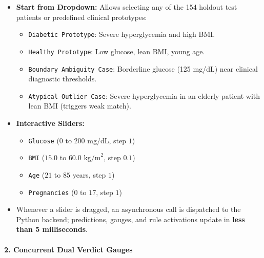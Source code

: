 \begin{itemize}
\tightlist
\item
  \textbf{Start from Dropdown:} Allows selecting any of the 154 holdout
  test patients or predefined clinical prototypes:

  \begin{itemize}
  \tightlist
  \item
    \texttt{Diabetic\ Prototype}: Severe hyperglycemia and high BMI.
  \item
    \texttt{Healthy\ Prototype}: Low glucose, lean BMI, young age.
  \item
    \texttt{Boundary\ Ambiguity\ Case}: Borderline glucose (125 mg/dL)
    near clinical diagnostic thresholds.
  \item
    \texttt{Atypical\ Outlier\ Case}: Severe hyperglycemia in an elderly
    patient with lean BMI (triggers weak match).
  \end{itemize}
\item
  \textbf{Interactive Sliders:}

  \begin{itemize}
  \tightlist
  \item
    \texttt{Glucose} (\(0\) to \(200\) mg/dL, step \(1\))
  \item
    \texttt{BMI} (\(15.0\) to \(60.0 \text{ kg/m}^2\), step \(0.1\))
  \item
    \texttt{Age} (\(21\) to \(85\) years, step \(1\))
  \item
    \texttt{Pregnancies} (\(0\) to \(17\), step \(1\))
  \end{itemize}
\item
  Whenever a slider is dragged, an asynchronous call is dispatched to
  the Python backend; predictions, gauges, and rule activations update
  in \textbf{less than 5 milliseconds}.
\end{itemize}

\paragraph{2. Concurrent Dual Verdict
Gauges}\label{concurrent-dual-verdict-gauges}

